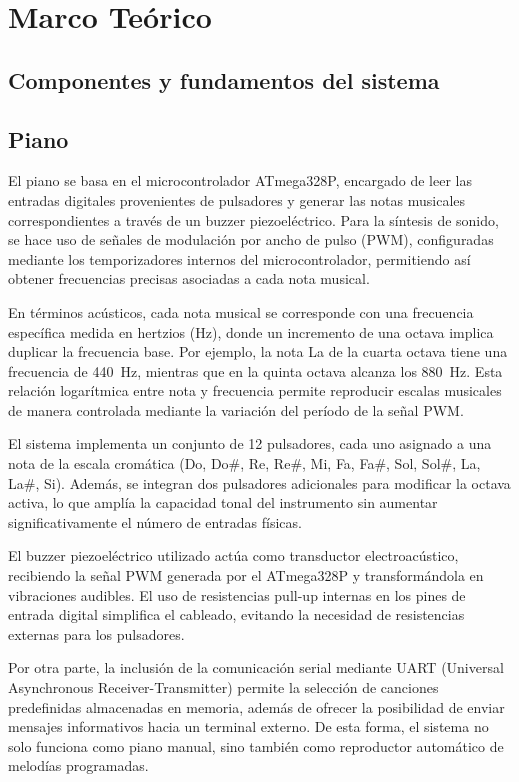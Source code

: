 \section{Marco Teórico}

\subsection{Componentes y fundamentos del sistema}



\subsection{Piano}

El piano se basa en el microcontrolador ATmega328P, encargado de leer las entradas digitales provenientes de pulsadores y generar las notas musicales correspondientes a través de un buzzer piezoeléctrico. 
Para la síntesis de sonido, se hace uso de señales de modulación por ancho de pulso (PWM), configuradas mediante los temporizadores internos del microcontrolador, permitiendo así obtener frecuencias precisas asociadas a cada nota musical.

En términos acústicos, cada nota musical se corresponde con una frecuencia específica medida en hertzios (Hz), donde un incremento de una octava implica duplicar la frecuencia base. 
Por ejemplo, la nota La de la cuarta octava tiene una frecuencia de 440~Hz, mientras que en la quinta octava alcanza los 880~Hz. 
Esta relación logarítmica entre nota y frecuencia permite reproducir escalas musicales de manera controlada mediante la variación del período de la señal PWM.

El sistema implementa un conjunto de 12 pulsadores, cada uno asignado a una nota de la escala cromática (Do, Do\#, Re, Re\#, Mi, Fa, Fa\#, Sol, Sol\#, La, La\#, Si). 
Además, se integran dos pulsadores adicionales para modificar la octava activa, lo que amplía la capacidad tonal del instrumento sin aumentar significativamente el número de entradas físicas.

El buzzer piezoeléctrico utilizado actúa como transductor electroacústico, recibiendo la señal PWM generada por el ATmega328P y transformándola en vibraciones audibles. 
El uso de resistencias pull-up internas en los pines de entrada digital simplifica el cableado, evitando la necesidad de resistencias externas para los pulsadores.

Por otra parte, la inclusión de la comunicación serial mediante UART (Universal Asynchronous Receiver-Transmitter) permite la selección de canciones predefinidas almacenadas en memoria, 
además de ofrecer la posibilidad de enviar mensajes informativos hacia un terminal externo. 
De esta forma, el sistema no solo funciona como piano manual, sino también como reproductor automático de melodías programadas.

